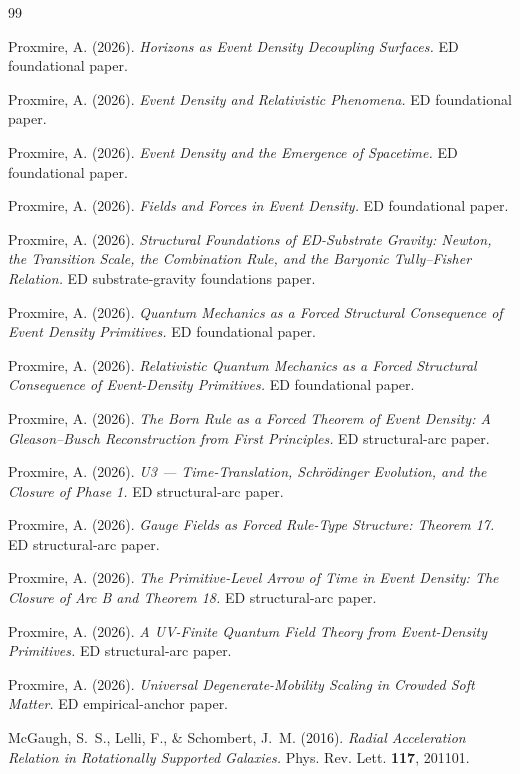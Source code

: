 \documentclass[11pt,a4paper]{article}
\begin{document}
\begin{thebibliography}{99}

 Proxmire, A. (2026). \emph{Horizons as Event Density Decoupling Surfaces.} ED foundational paper.

 Proxmire, A. (2026). \emph{Event Density and Relativistic Phenomena.} ED foundational paper.

 Proxmire, A. (2026). \emph{Event Density and the Emergence of Spacetime.} ED foundational paper.

 Proxmire, A. (2026). \emph{Fields and Forces in Event Density.} ED foundational paper.

 Proxmire, A. (2026). \emph{Structural Foundations of ED-Substrate Gravity: Newton, the Transition Scale, the Combination Rule, and the Baryonic Tully--Fisher Relation.} ED substrate-gravity foundations paper.

 Proxmire, A. (2026). \emph{Quantum Mechanics as a Forced Structural Consequence of Event Density Primitives.} ED foundational paper.

 Proxmire, A. (2026). \emph{Relativistic Quantum Mechanics as a Forced Structural Consequence of Event-Density Primitives.} ED foundational paper.

 Proxmire, A. (2026). \emph{The Born Rule as a Forced Theorem of Event Density: A Gleason--Busch Reconstruction from First Principles.} ED structural-arc paper.

 Proxmire, A. (2026). \emph{U3 --- Time-Translation, Schr\"odinger Evolution, and the Closure of Phase 1.} ED structural-arc paper.

 Proxmire, A. (2026). \emph{Gauge Fields as Forced Rule-Type Structure: Theorem 17.} ED structural-arc paper.

 Proxmire, A. (2026). \emph{The Primitive-Level Arrow of Time in Event Density: The Closure of Arc B and Theorem 18.} ED structural-arc paper.

 Proxmire, A. (2026). \emph{A UV-Finite Quantum Field Theory from Event-Density Primitives.} ED structural-arc paper.

 Proxmire, A. (2026). \emph{Universal Degenerate-Mobility Scaling in Crowded Soft Matter.} ED empirical-anchor paper.

 McGaugh, S.~S., Lelli, F., \& Schombert, J.~M. (2016). \emph{Radial Acceleration Relation in Rotationally Supported Galaxies.} Phys. Rev. Lett. \textbf{117}, 201101.


\end{thebibliography}
\end{document}
